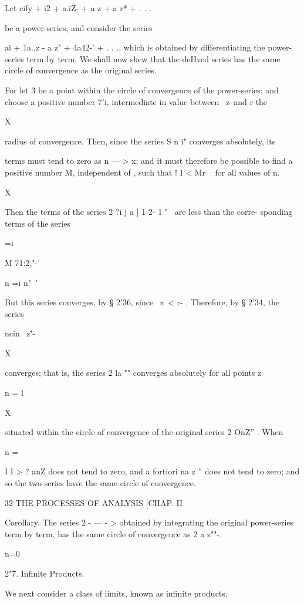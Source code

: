 Let cify + i2 + a.iZ- + a z + a r* + . . .

be a power-series, and consider the series

ai + 1a.,z - a z" + 4a42-' + . . ., which is obtained by
differentiating the power-series term by term. We shall now shew that
the deHved series has the same circle of convergence as the original
series.

For let 3 be a point within the circle of convergence of the
power-series; and choose a positive number 7'i, intermediate in value
between \ z\ and r the

X

radius of convergence. Then, since the series S n i" converges
absolutely, its

terms must tend to zero as n — > x; and it must therefore be possible
to find a positive number M, independent of , such that ! I < Mr ~ for
all values of n.

 X

Then the terms of the series 2 ?i j a | 1 2- 1 "~ are less than the
corre- sponding terms of the series



 =i



M 71:2,"-'

n =i n"~'

But this series converges, by § 2'36, since \ z\ < r- . Therefore, by
§ 2'34, the series

 ncin \ z\''-

X

converges; that is, the series 2 la "" converges absolutely for all
points z

n = l

X

situated within the circle of convergence of the original series 2
OnZ'' . When

n =

I I > ? anZ does not tend to zero, and a fortiori na z '' does not
tend to zero; and so the two series have the same circle of
convergence.



32 THE PROCESSES OF ANALYSIS [CHAP. II

Corollary. The series 2 - — - > obtained by integrating the original
power-series term by term, has the same circle of convergence as 2 a
z""-.

n=0

2"7. Infinite Products.

We next consider a class of limits, known as infinite products.

